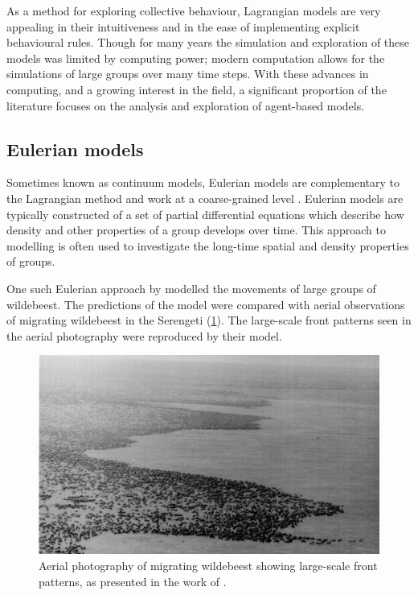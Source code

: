 As a method for exploring collective behaviour, Lagrangian models are very
appealing in their intuitiveness and in the ease of implementing explicit
behavioural rules. Though for many years the simulation and exploration of
these models was limited by computing power; modern computation allows for the
simulations of large groups over many time steps. With these advances in
computing, and a growing interest in the field, a significant proportion of the
literature focuses on the analysis and exploration of agent-based models.

\subsection{Eulerian models} \label{ssec:eulerian_models}

Sometimes known as continuum models, Eulerian models are complementary to the
Lagrangian method and work at a coarse-grained level \parencite{giardina08}.
Eulerian models are typically constructed of a set of partial differential
equations which describe how density and other properties of a group develops
over time. This approach to modelling is often used to investigate the
long-time spatial and density properties of groups.

One such Eulerian approach by \textcite{gueron93} modelled the movements of
large groups of wildebeest. The predictions of the model were compared with
aerial observations of migrating wildebeest in the Serengeti
(\cref{fig:wildebeest}). The large-scale front patterns seen in the aerial
photography were reproduced by their model.

\begin{figure}[tb]
    \includegraphics[width=\textwidth]{wildebeest.png}
    \caption{Aerial photography of migrating wildebeest showing large-scale
      front patterns, as presented in the work of \textcite{gueron93}.}
    \label{fig:wildebeest}
\end{figure}

